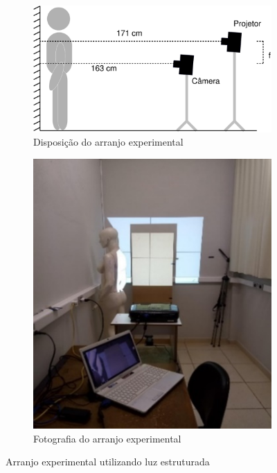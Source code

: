 \documentclass[a4paper, 12pt]{article}
\begin{document}
\begin{figure}[h!]
\centering
    \begin{subfigure}{.695\textwidth}
      \centering
      \includegraphics[width=.95\linewidth]{configuracao_sistema_1.eps}  
      \caption{Disposição do arranjo experimental}
      \label{arranjo-experimetal:1}
    \end{subfigure}
    \begin{subfigure}{.295\textwidth}
      \centering
      \includegraphics[width=.95\linewidth]{configuracao_sistema_2.png}
      \caption{Fotografia do arranjo experimental}
      \label{arranjo-experimetal:2}
    \end{subfigure}	
\caption{Arranjo experimental utilizando luz estruturada}
\label{arranjo-experimetal}
\end{figure}
\end{document}
